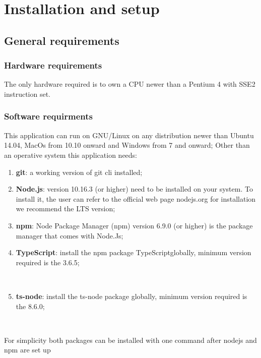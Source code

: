 \section{Installation and setup}
\subsection{General requirements}
\subsubsection{Hardware requirements}
The only hardware required is to own a CPU newer than a Pentium 4 with SSE2 instruction set. 
\subsubsection{Software requirments }
This application can run on GNU/Linux on any distribution newer than Ubuntu 14.04, MacOs from 10.10 onward and Windows from 7 and onward; Other than an operative system this application needs: 
\begin{enumerate}
	\item \textbf{git}: a working version of git cli installed;
	\item \textbf{Node.js}: version 10.16.3 (or higher) need to be installed on your system. To install it, the user can refer to the official web page nodejs.org for installation we recommend the LTS version;
	\item \textbf{npm}: Node Package Manager (npm) version 6.9.0 (or higher) is the package manager that comes with Node.Js; 
	\item \textbf{TypeScript}: install the npm package TypeScript\glo globally, minimum version required is the 3.6.5; \newline\newline \centerline{}\\
	\item \textbf{ts-node}: install the ts-node package globally, minimum version required is the 8.6.0; \newline\newline \centerline{}\\
\end{enumerate}
For simplicity both packages can be installed with one command after nodejs and npm are set up\\\\
\centerline{}\\
